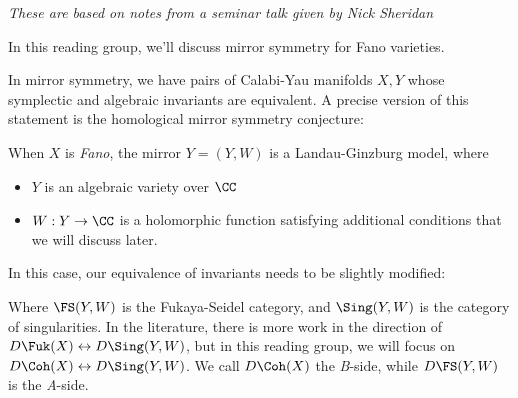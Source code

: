 

\emph{These are based on notes from a seminar talk given by Nick Sheridan}


In this reading group, we'll discuss mirror symmetry for Fano varieties. 

In mirror symmetry, we have pairs of Calabi-Yau manifolds $X, Y$ whose symplectic and algebraic invariants are equivalent. A precise version of this statement is the homological mirror symmetry conjecture:


When $X$ is \emph{Fano}, the mirror $Y = (Y, W)$ is a Landau-Ginzburg model, where 
\begin{itemize}
    \item $Y$ is an algebraic variety over $\CC$ 
    \item $W: Y \to \CC$ is a holomorphic function satisfying additional conditions that we will discuss later.
\end{itemize}
In this case, our equivalence of invariants needs to be slightly modified:


Where $\FS(Y, W)$ is the Fukaya-Seidel category, and $\Sing(Y, W)$ is the category of singularities. 
In the literature, there is more work in the direction of $D\Fuk(X) \leftrightarrow D\Sing(Y, W)$, but in this reading group, we will focus on $D\Coh(X)\leftrightarrow D\Sing(Y, W)$. 
We call $D\Coh(X)$ the \emph{B}-side, while $D\FS(Y, W)$ is the \emph{A}-side. 




